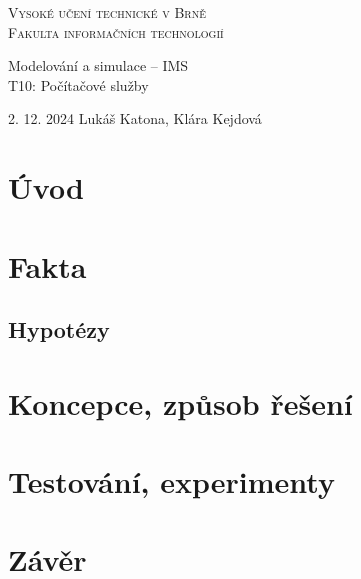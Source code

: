 \documentclass[11pt, a4paper]{article}
\begin{document}
\begin{titlepage}
    \begin{center}
        \textsc{\Huge Vysoké učení technické v Brně\\\vspace{0.5em}\huge Fakulta informačních technologií}
        
        {\LARGE Modelování a simulace -- IMS\\\vspace{0.5em}}
        {\Huge T10: Počítačové služby}
        
    \end{center}
    {\Large 2. 12. 2024 \hfill Lukáš Katona, Klára Kejdová}
\end{titlepage}

\newpage

\section{Úvod}


\section{Fakta}


\subsection{Hypotézy}


\section{Koncepce, způsob řešení}

\section{Testování, experimenty}

\section{Závěr}



    
\end{document}
